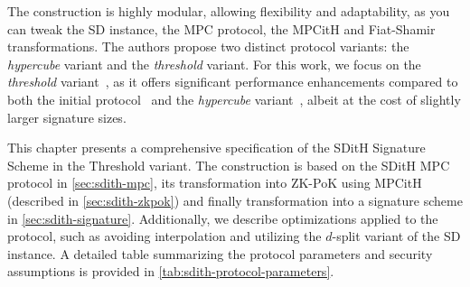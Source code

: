 \documentclass[11pt]{report}
\theoremstyle{definition}
\theoremstyle{plain}
\begin{document}
The construction is highly modular, allowing flexibility and adaptability, as you can tweak the SD instance, the MPC protocol, the MPCitH and Fiat-Shamir transformations. The authors propose two distinct protocol variants: the \textit{hypercube} variant and the \textit{threshold} variant. For this work, we focus on the \textit{threshold} variant~\cite{aguilarsyndrome11,feneuil2023threshold,feneuil2023threshold2}, as it offers significant performance enhancements compared to both the initial protocol~\cite{feneuil2022syndrome} and the \textit{hypercube} variant~\cite{aguilarsyndrome11,aguilar2023return,feneuil2023threshold2}, albeit at the cost of slightly larger signature sizes.

This chapter presents a comprehensive specification of the SDitH Signature Scheme in the Threshold variant. The construction is based on the SDitH MPC protocol in \autoref{sec:sdith-mpc}, its transformation into ZK-PoK using MPCitH (described in \autoref{sec:sdith-zkpok}) and finally transformation into a signature scheme in \autoref{sec:sdith-signature}. Additionally, we describe optimizations applied to the protocol, such as avoiding interpolation and utilizing the $d$-split variant of the SD instance. A detailed table summarizing the protocol parameters and security assumptions is provided in \autoref{tab:sdith-protocol-parameters}.
\end{document}
